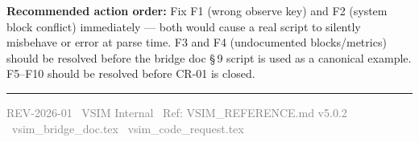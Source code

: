 \documentclass[11pt,a4paper]{article}
\begin{document}
\vspace{8pt}
\begin{warnbox}
  \textbf{Recommended action order:} Fix F1 (wrong observe key) and F2 (system block conflict)
  immediately --- both would cause a real script to silently misbehave or error at parse time.
  F3 and F4 (undocumented blocks/metrics) should be resolved before the bridge doc \S\,9
  script is used as a canonical example. F5--F10 should be resolved before CR-01 is closed.
\end{warnbox}

\vspace{12pt}
\noindent\rule{\linewidth}{0.5pt}
{\small\sffamily\textcolor{gray}{REV-2026-01 \textperiodcentered\
  VSIM Internal \textperiodcentered\
  Ref: VSIM\_REFERENCE.md v5.0.2 \textperiodcentered\
  vsim\_bridge\_doc.tex \textperiodcentered\ vsim\_code\_request.tex}}
\end{document}

